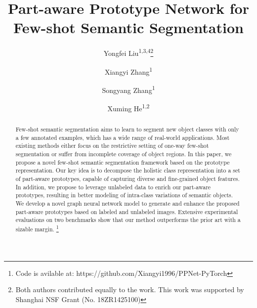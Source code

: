 \documentclass[runningheads]{llncs}
\makeatletter
\newcommand{\printfnsymbol}[1]{\textsuperscript{\@fnsymbol{#1}}}
\makeatother
\begin{document}
\pagestyle{headings}
\mainmatter
\def\ECCVSubNumber{754}  

\title{Part-aware Prototype Network for Few-shot Semantic Segmentation} 

\begin{comment}
\titlerunning{ECCV-20 submission ID \ECCVSubNumber} 
\authorrunning{ECCV-20 submission ID \ECCVSubNumber} 
\author{Anonymous ECCV submission}
\institute{Paper ID \ECCVSubNumber}
\end{comment}





\author{Yongfei Liu\textsuperscript{\rm 1,3,4}\thanks{Both authors contributed equally to the work. This work was supported by Shanghai NSF Grant (No. 18ZR1425100)} \and
Xiangyi Zhang\textsuperscript{\rm 1}\printfnsymbol{1} \and
Songyang Zhang\textsuperscript{\rm 1}\and 
Xuming He\textsuperscript{\rm 1,2}}
\maketitle

\begin{abstract}
  Few-shot semantic segmentation aims to learn to segment new object classes with only a few annotated examples, 
  which has a wide range of real-world applications. Most existing methods either focus on the restrictive setting 
  of one-way few-shot segmentation or suffer from incomplete coverage of object regions. In this paper, we propose 
  a novel few-shot semantic segmentation framework based on the prototype representation. Our key idea is to decompose 
  the holistic class representation into a set of part-aware prototypes, capable of capturing diverse and fine-grained 
  object features. In addition, we propose to leverage unlabeled data to enrich our part-aware prototypes, resulting 
  in better modeling of intra-class variations of semantic objects. We develop a novel graph neural network model to 
  generate and enhance the proposed part-aware prototypes based on labeled and unlabeled images. 
  Extensive experimental evaluations on two benchmarks show that our method outperforms the prior art with a sizable margin.
  \footnote{Code is avilable at: https://github.com/Xiangyi1996/PPNet-PyTorch}

\end{abstract}
\end{document}

